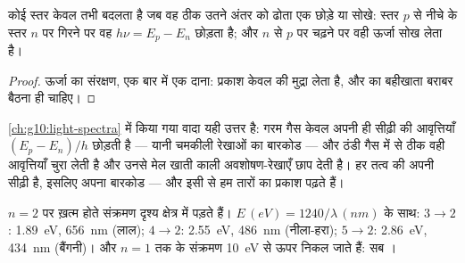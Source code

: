 \begin{theorem}[संक्रमण का फ़ोटॉन]\label{thm:g12:quantum-world:transition}
कोई  स्तर केवल तभी बदलता है जब वह ठीक उतने अंतर को ढोता एक
 छोड़े या सोखे: स्तर $p$ से नीचे के स्तर $n$ पर गिरने पर
वह $h\nu = E_p - E_n$ छोड़ता है; और $n$ से $p$ पर चढ़ने पर वही ऊर्जा सोख
लेता है।
\end{theorem}

\begin{proof}
ऊर्जा का संरक्षण, एक बार में एक दाना: प्रकाश केवल  की
मुद्रा लेता है, और  का बहीखाता बराबर बैठना ही चाहिए।
\end{proof}

\begin{remark}[रेखा-वर्णक्रम की व्याख्या]\label{rem:g12:quantum-world:lines}
\cref{ch:g10:light-spectra} में किया गया वादा यही उत्तर है: गरम गैस केवल अपनी ही सीढ़ी की
आवृत्तियाँ $(E_p - E_n)/h$ छोड़ती है --- यानी चमकीली रेखाओं का बारकोड --- और ठंडी गैस
 में से ठीक वही आवृत्तियाँ चुरा लेती है और उनसे मेल खाती
काली अवशोषण-रेखाएँ छाप देती है। हर तत्व की अपनी सीढ़ी है, इसलिए अपना बारकोड ---
और इसी से हम तारों का प्रकाश पढ़ते हैं।
\end{remark}

\begin{example}[हाइड्रोजन की दृश्य रेखाएँ]\label{ex:g12:quantum-world:balmer}
$n = 2$ पर ख़त्म होते संक्रमण दृश्य क्षेत्र में पड़ते हैं। $E \,(\unit{eV}) =
1240/\lambda\,(\unit{nm})$ के साथ:
$3 \to 2$: \qty{1.89}{eV}, \qty{656}{nm} (लाल); $4 \to 2$: \qty{2.55}{eV}, \qty{486}{nm} (नीला-हरा);
$5 \to 2$: \qty{2.86}{eV}, \qty{434}{nm} (बैंगनी)। और $n = 1$ तक के संक्रमण \qty{10}{eV} से ऊपर
निकल जाते हैं: सब ।
\end{example}


